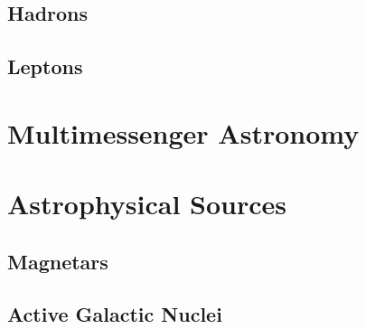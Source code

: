 \subsection*{Hadrons}
\label{sub:hadrons}

\subsection*{Leptons}
\label{sub:leptons}

\section{Multimessenger Astronomy}
\label{sec:multimessenger}

\section{Astrophysical Sources}
\label{sec:sources}

\subsection*{Magnetars}
\label{sub:magnetars}

\subsection*{Active Galactic Nuclei}
\label{sub:agn}

